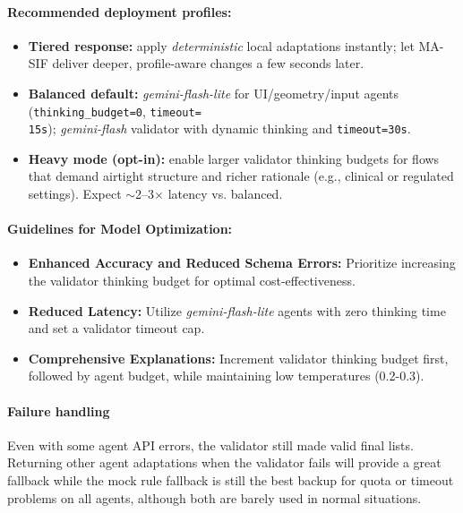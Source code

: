 \documentclass[openany]{book}
\begin{document}
\paragraph{Recommended deployment profiles:}
\begin{itemize}
    \item \textbf{Tiered response:} apply \emph{deterministic} local adaptations instantly; let MA-SIF deliver deeper, profile-aware changes a few seconds later.
    \item \textbf{Balanced default:} \emph{gemini-flash-lite} for UI/geometry/input agents (\texttt{thinking\_budget=0}, \texttt{timeout=\\15s}); \emph{gemini-flash} validator with dynamic thinking and \texttt{timeout=30s}.
    \item \textbf{Heavy mode (opt-in):} enable larger validator thinking budgets for flows that demand airtight structure and richer rationale (e.g., clinical or regulated settings). Expect $\sim$2–3$\times$ latency vs. balanced.
\end{itemize}

\paragraph{Guidelines for Model Optimization:}
\begin{itemize}
    \item \textbf{Enhanced Accuracy and Reduced Schema Errors:} Prioritize increasing the validator thinking budget for optimal cost-effectiveness.
    \item \textbf{Reduced Latency:} Utilize \emph{gemini-flash-lite} agents with zero thinking time and set a validator timeout cap.
    \item \textbf{Comprehensive Explanations:} Increment validator thinking budget first, followed by agent budget, while maintaining low temperatures (0.2-0.3).
\end{itemize}

\paragraph{Failure handling}
Even with some agent API errors, the validator still made valid final lists. Returning other agent adaptations when the validator fails will provide a great fallback while the mock rule fallback is still the best backup for quota or timeout problems on all agents, although both are barely used in normal situations.
\end{document}
